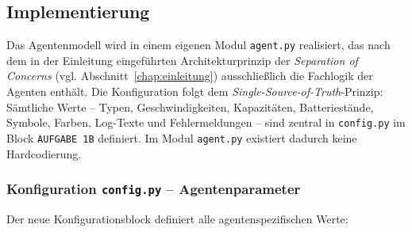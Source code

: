 \subsection{Implementierung}

Das Agentenmodell wird in einem eigenen Modul \texttt{agent.py} realisiert, das nach dem in der Einleitung eingeführten Architekturprinzip der \textit{Separation of Concerns} (vgl. Abschnitt~\ref{chap:einleitung}) ausschließlich die Fachlogik der Agenten enthält. Die Konfiguration folgt dem \textit{Single-Source-of-Truth}-Prinzip: Sämtliche Werte -- Typen, Geschwindigkeiten, Kapazitäten, Batteriestände, Symbole, Farben, Log-Texte und Fehlermeldungen -- sind zentral in \texttt{config.py} im Block \texttt{AUFGABE 1B} definiert. Im Modul \texttt{agent.py} existiert dadurch keine Hardcodierung.


\subsubsection{Konfiguration \texttt{config.py} – Agentenparameter}

Der neue Konfigurationsblock definiert alle agentenspezifischen Werte:




